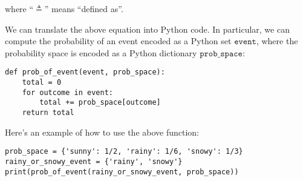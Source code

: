 \documentclass[6008notes.tex]{subfiles}
\begin{document}
where ``$\triangleq$'' means ``defined as''.

We can translate the above equation into Python code. In particular, we can compute the probability of an event encoded as a Python set $\texttt{event}$, where the probability space is encoded as a Python dictionary $\texttt{prob\_space}$:

\begin{lstlisting}
def prob_of_event(event, prob_space):
    total = 0
    for outcome in event:
        total += prob_space[outcome]
    return total
\end{lstlisting}

Here's an example of how to use the above function:

\begin{lstlisting}
prob_space = {'sunny': 1/2, 'rainy': 1/6, 'snowy': 1/3}
rainy_or_snowy_event = {'rainy', 'snowy'}
print(prob_of_event(rainy_or_snowy_event, prob_space))
\end{lstlisting}
\end{document}
